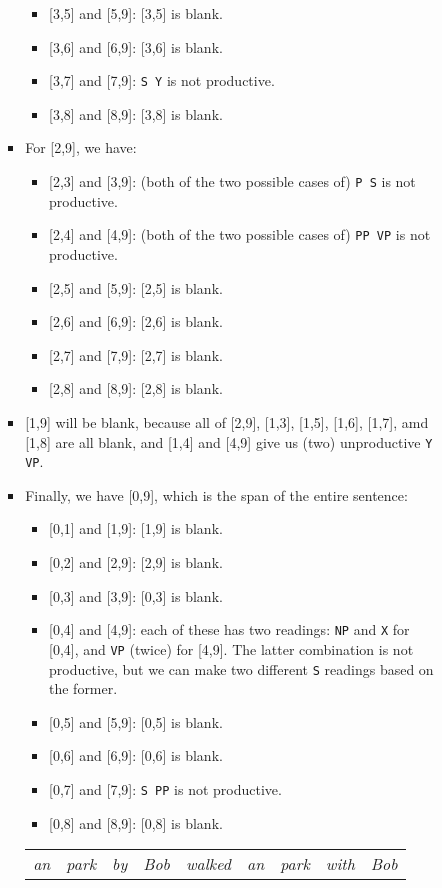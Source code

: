 \documentclass[a4paper]{article}
\begin{document}
\begin{enumerate}
\begin{enumerate}
\begin{enumerate}
\begin{itemize}
\begin{itemize}
\item{} [3,5] and [5,9]: [3,5] is blank.
\item{} [3,6] and [6,9]: [3,6] is blank.
\item{} [3,7] and [7,9]: \texttt{S Y} is not productive.
\item{} [3,8] and [8,9]: [3,8] is blank.
\end{itemize}
\item For [2,9], we have:
\begin{itemize}
\item{} [2,3] and [3,9]: (both of the two possible cases of) \texttt{P S} is not productive.
\item{} [2,4] and [4,9]: (both of the two possible cases of) \texttt{PP VP} is not productive.
\item{} [2,5] and [5,9]: [2,5] is blank.
\item{} [2,6] and [6,9]: [2,6] is blank.
\item{} [2,7] and [7,9]: [2,7] is blank.
\item{} [2,8] and [8,9]: [2,8] is blank.
\end{itemize}
\item{} [1,9] will be blank, because all of [2,9], [1,3], [1,5], [1,6], [1,7], amd [1,8] are all blank, and [1,4] and [4,9] give us (two) unproductive \texttt{Y VP}.
\item Finally, we have [0,9], which is the span of the entire sentence:
\begin{itemize}
\item{} [0,1] and [1,9]: [1,9] is blank.
\item{} [0,2] and [2,9]: [2,9] is blank.
\item{} [0,3] and [3,9]: [0,3] is blank.
\item{} [0,4] and [4,9]: each of these has two readings: \texttt{NP} and \texttt{X} for [0,4], and \texttt{VP} (twice) for [4,9]. The latter combination is not productive, but we can make two different \texttt{S} readings based on the former.
\item{} [0,5] and [5,9]: [0,5] is blank.
\item{} [0,6] and [6,9]: [0,6] is blank.
\item{} [0,7] and [7,9]: \texttt{S PP} is not productive.
\item{} [0,8] and [8,9]: [0,8] is blank. 
\end{itemize}
\begin{table}[ht]
\centering
\begin{tabular}{ccccccccc}
\textit{an} & \textit{park} & \textit{by} & \textit{Bob} & \textit{walked} & \textit{an} & \textit{park} & \textit{with} & \textit{Bob}\\

\end{tabular}
\end{table}
\end{itemize}
\end{enumerate}
\end{enumerate}
\end{enumerate}
\end{document}
